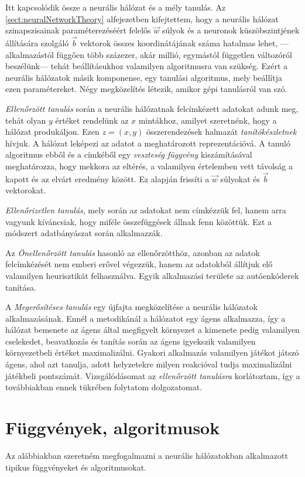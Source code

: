 Itt kapcsolódik össze a neurális hálózat és a mély tanulás. Az \ref{sect:neuralNetworkTheory} alfejezetben kifejtettem, hogy a neurális hálózat szinapszisainak paraméterezéséért felelős $\vec{w}$ súlyok és a neuronok küszöbszintjének állítására szolgáló $\vec{b}$ vektorok összes koordinátájának száma hatalmas lehet, ---alkalmazástól függően több százezer, akár millió, egymástól független változóról beszélünk--- tehát beállításukhoz valamilyen algoritmusra van szükség. Ezért a neurális hálózatok másik komponense, egy tanulási algoritmus, mely beállítja ezen paramétereket. Négy  megközelítés létezik, amikor gépi tanulásról van szó.

\emph{Ellenőrzött tanulás} során a neurális hálózatnak felcímkézett adatokat adunk meg, tehát olyan $y$ értéket  rendelünk az $x$ mintákhoz, amilyet szeretnénk, hogy a hálózat produkáljon. Ezen $z=(x,y)$ összerendezések halmazát \emph{tanítókészletnek} hívjuk. A hálózat leképezi az adatot a meghatározott reprezentációvá. A tanuló algoritmus ebből és a címkéből egy \emph{veszteség függvény} kiszámításával meghatározza, hogy mekkora az eltérés, a valamilyen értelemben vett távolság a kapott és az elvárt eredmény között. Ez alapján frissíti a $\vec{w}$ súlyokat és $\vec{b}$ vektorokat.

\emph{Ellenőrizetlen tanulás}, mely során az adatokat nem címkézzük fel, hanem arra vagyunk kíváncsiak, hogy miféle összefüggések állnak fenn közöttük. Ezt a módszert adatbányászat során alkalmazzák. 

Az \emph{Önellenőrzött tanulás} hasonló az ellenőrzötthöz, azonban az adatok felcímkézését nem emberi erővel végezzük, hanem az adatokból állítjuk elő valamilyen heurisztikát felhasználva. Egyik alkalmazási területe az autóenkóderek tanítása.

A \emph{Megerősítéses tanulás} egy újfajta megközelítése a neurális hálózatok alkalmazásának. Ennél a metodikánál a hálózatot egy ágens alkalmazza, így a hálózat bemenete az ágens által megfigyelt környezet a kimenete pedig valamilyen cselekedet, beavatkozás és tanítás során az ágens igyekszik valamilyen környezetbeli értéket maximalizálni. Gyakori alkalmazás valamilyen játékot játszó ágens, ahol azt tanulja, adott helyzetekre milyen reakcióval tudja maximalizálni játékbeli pontszámát.
Vizsgálódásomat az \emph{ellenőrzött tanulásra} korlátoztam, így a továbbiakban ennek tükrében folytatom dolgozatomat.

\section{Függvények, algoritmusok}\label{sec:fuggvenyek-algoritmusok}
Az alábbiakban szeretném megfogalmazni a neurális hálózatokban alkalmazott tipikus függvényeket és algoritmusokat.

